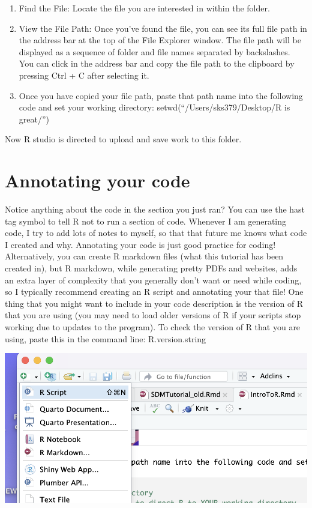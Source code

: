 \documentclass[
]{book}
\begin{document}
\begin{enumerate}
\def\labelenumi{\arabic{enumi}.}
\item
  Find the File: Locate the file you are interested in within the folder.
\item
  View the File Path: Once you've found the file, you can see its full file path in the address bar at the top of the File Explorer window. The file path will be displayed as a sequence of folder and file names separated by backslashes. You can click in the address bar and copy the file path to the clipboard by pressing Ctrl + C after selecting it.
\item
  Once you have copied your file path, paste that path name into the following code and set your working directory: setwd(``/Users/sks379/Desktop/R is great/'')
\end{enumerate}

Now R studio is directed to upload and save work to this folder.

\hypertarget{annotating-your-code}{%
\section{Annotating your code}\label{annotating-your-code}}

Notice anything about the code in the section you just ran? You can use the hast tag symbol to tell R not to run a section of code. Whenever I am generating code, I try to add lots of notes to myself, so that that future me knows what code I created and why. Annotating your code is just good practice for coding! Alternatively, you can create R markdown files (what this tutorial has been created in), but R markdown, while generating pretty PDFs and websites, adds an extra layer of complexity that you generally don't want or need while coding, so I typically recommend creating an R script and annotating your that file! One thing that you might want to include in your code description is the version of R that you are using (you may need to load older versions of R if your scripts stop working due to updates to the program). To check the version of R that you are using, paste this in the command line: R.version.string

\includegraphics{images:/01-intro/createrscript.png}
\end{document}
